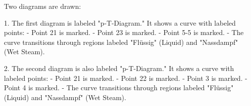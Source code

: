 Two diagrams are drawn:  

1. The first diagram is labeled "p-T-Diagram." It shows a curve with labeled points:  
   - Point 21 is marked.  
   - Point 23 is marked.  
   - Point 5-5 is marked.  
   - The curve transitions through regions labeled "Flüssig" (Liquid) and "Nassdampf" (Wet Steam).  

2. The second diagram is also labeled "p-T-Diagram." It shows a curve with labeled points:  
   - Point 21 is marked.  
   - Point 22 is marked.  
   - Point 3 is marked.  
   - Point 4 is marked.  
   - The curve transitions through regions labeled "Flüssig" (Liquid) and "Nassdampf" (Wet Steam).